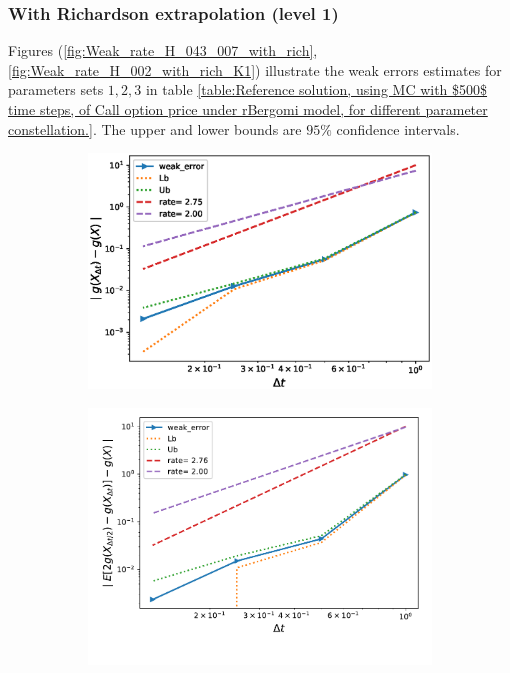 \subsubsection{With Richardson extrapolation (level 1)}
Figures (\ref{fig:Weak_rate_H_043_007_with_rich}, \ref{fig:Weak_rate_H_002_with_rich_K1}) illustrate the weak errors estimates for parameters sets $1,2,3$ in table \ref{table:Reference solution, using MC with $500$ time steps, of Call option price under rBergomi model, for different parameter constellation.}. The upper and lower bounds are $95\%$ confidence intervals.
\FloatBarrier
\begin{figure}[h!]
	\centering
	\begin{subfigure}{.35\textwidth}
		\centering
		\includegraphics[width=1\linewidth]{./figures/rBergomi_weak_error_rates/with_richardson/H_043/weak_convergence_order_Bergomi_H_043_K_1_M_10_6_richardson_relative}
		\caption{}
		\label{fig:sub3}
	\end{subfigure}%
	\begin{subfigure}{.35\textwidth}
		\centering
		\includegraphics[width=1\linewidth]{./figures/rBergomi_weak_error_rates/with_richardson/H_007/weak_convergence_order_Bergomi_H_007_K_1_richardson_relative_M_10_6}
		\caption{}
		\label{fig:sub4}
	\end{subfigure}
	

\end{figure}

